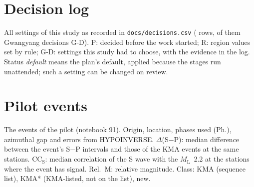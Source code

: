 \documentclass[11pt,a4paper]{article}
\newcommand{\ML}{\ensuremath{M_\mathrm{L}}}
\begin{document}
\FloatBarrier



\clearpage
\appendix
\section{Decision log}
\label{app:decisions}

All settings of this study as recorded in \texttt{docs/decisions.csv} ( rows,  of them Gwangyang decisions G-D). P: decided before the work started; R: region values set by rule; G-D: settings this study had to choose, with the evidence in the log. Status \emph{default} means the plan's default, applied because the stages run unattended; such a setting can be changed on review.

{\footnotesize

}

\section{Pilot events}
\label{app:pilot}

The  events of the pilot (notebook 91). Origin, location, phases used (Ph.), azimuthal gap and errors from HYPOINVERSE. $\Delta$(S$-$P): median difference between the event's S$-$P intervals and those of the KMA events at the same stations. CC$_\mathrm{S}$: median correlation of the S wave with the \ML\ 2.2 at the stations where the event has signal. Rel.~M: relative magnitude. Class: KMA (sequence list), KMA* (KMA-listed, not on the list), new.

{\scriptsize\setlength{\tabcolsep}{3.2pt}

}
\end{document}
